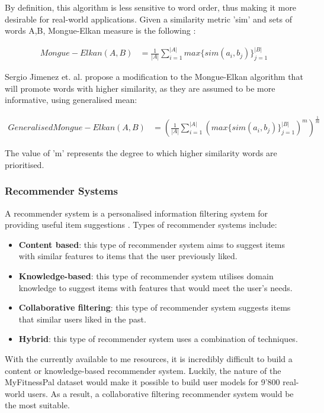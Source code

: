 \documentclass{article}
\begin{document}
\bigskip
\noindent By definition, this algorithm is less sensitive to word order, thus making it more desirable for real-world applications. Given a similarity metric 'sim' and sets of words A,B, Mongue-Elkan measure is the following \cite{mongue_elkan}: 

\begin{align*}
    Mongue-Elkan(A,B) &= \frac{1}{|A|} \sum_{i=1}^{|A|} max\{sim(a_i,b_j)\}_{j=1}^{|B|}
\end{align*}

\noindent Sergio Jimenez et. al. \cite{mongue_elkan} propose a modification to the Mongue-Elkan algorithm that will promote words with higher similarity, as they are assumed to be more informative, using generalised mean:

\begin{align*}
    Generalised Mongue-Elkan(A,B) &= (\frac{1}{|A|} \sum_{i=1}^{|A|} (max\{sim(a_i,b_j)\}_{j=1}^{|B|})^m)^{\frac{1}{m}}
\end{align*}

\noindent The value of 'm' represents the degree to which higher similarity words are prioritised. 

\subsubsection{Recommender Systems}
A recommender system is a personalised information filtering system for providing useful item suggestions \cite{recommender_systems_handbook}. Types of recommender systems include: 

\begin{itemize}
    \item \textbf{Content based}: this type of recommender system aims to suggest items with similar features to items that the user previously liked. 
    \item \textbf{Knowledge-based}: this type of recommender system utilises domain knowledge to suggest items with features that would meet the user's needs.
    \item \textbf{Collaborative filtering}: this type of recommender system suggests items that similar users liked in the past.
    \item \textbf{Hybrid}: this type of recommender system uses a combination of techniques.
\end{itemize}

\bigskip
\noindent With the currently available to me resources, it is incredibly difficult to build a content or knowledge-based recommender system. Luckily, the nature of the MyFitnessPal dataset \cite{diet_success_predictions} would make it possible to build user models for 9'800 real-world users. As a result, a collaborative filtering recommender system would be the most suitable. 
\end{document}
